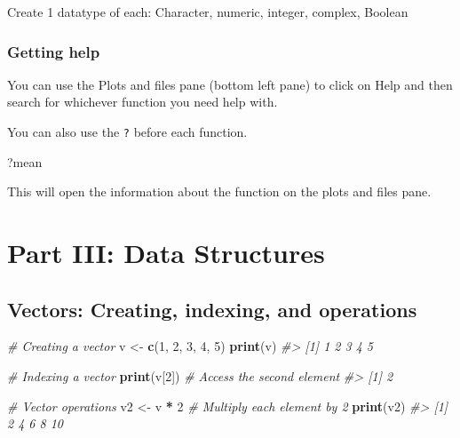 \documentclass[
]{book}
\newenvironment{Shaded}{\begin{snugshade}}{\end{snugshade}}
\newcommand{\CommentTok}[1]{\textcolor[rgb]{0.56,0.35,0.01}{\textit{#1}}}
\newcommand{\DecValTok}[1]{\textcolor[rgb]{0.00,0.00,0.81}{#1}}
\newcommand{\FunctionTok}[1]{\textcolor[rgb]{0.13,0.29,0.53}{\textbf{#1}}}
\newcommand{\NormalTok}[1]{#1}
\newcommand{\OtherTok}[1]{\textcolor[rgb]{0.56,0.35,0.01}{#1}}
\newcommand{\SpecialCharTok}[1]{\textcolor[rgb]{0.81,0.36,0.00}{\textbf{#1}}}
\begin{document}
Create 1 datatype of each: Character, numeric, integer, complex, Boolean

\subsection*{Getting help}\label{getting-help}

You can use the Plots and files pane (bottom left pane) to click on Help and then search for whichever function you need help with.

You can also use the \texttt{?} before each function.

\begin{Shaded}
\begin{Highlighting}[]
\NormalTok{?mean}
\end{Highlighting}
\end{Shaded}

This will open the information about the function on the plots and files pane.

\chapter*{Part III: Data Structures}\label{part-iii-data-structures}

\section*{Vectors: Creating, indexing, and operations}\label{vectors-creating-indexing-and-operations}

\begin{Shaded}
\begin{Highlighting}[]
\CommentTok{\# Creating a vector}
\NormalTok{v }\OtherTok{\textless{}{-}} \FunctionTok{c}\NormalTok{(}\DecValTok{1}\NormalTok{, }\DecValTok{2}\NormalTok{, }\DecValTok{3}\NormalTok{, }\DecValTok{4}\NormalTok{, }\DecValTok{5}\NormalTok{)}
\FunctionTok{print}\NormalTok{(v)}
\CommentTok{\#\textgreater{} [1] 1 2 3 4 5}

\CommentTok{\# Indexing a vector}
\FunctionTok{print}\NormalTok{(v[}\DecValTok{2}\NormalTok{])  }\CommentTok{\# Access the second element}
\CommentTok{\#\textgreater{} [1] 2}

\CommentTok{\# Vector operations}
\NormalTok{v2 }\OtherTok{\textless{}{-}}\NormalTok{ v }\SpecialCharTok{*} \DecValTok{2}  \CommentTok{\# Multiply each element by 2}
\FunctionTok{print}\NormalTok{(v2)}
\CommentTok{\#\textgreater{} [1]  2  4  6  8 10}
\end{Highlighting}
\end{Shaded}
\end{document}

